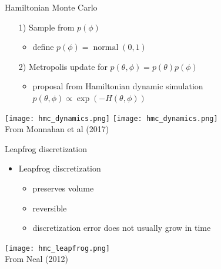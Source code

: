 \documentclass[finnish,english,t]{beamer}
\DeclareMathOperator{\normal}{normal}
\begin{document}
\begin{frame}{Hamiltonian Monte Carlo}

  \begin{itemize}
  \item[1)] Sample from $p(\phi)$
    \begin{itemize}
    \item define $p(\phi) = \normal(0,1)$
    \end{itemize}
  \item[2)] Metropolis update for $p(\theta,\phi)=p(\theta)p(\phi)$
    \begin{itemize}
    \item proposal from Hamiltonian dynamic simulation $p(\theta,\phi) \propto \exp(-H(\theta,\phi))$
    \end{itemize}
  
  \end{itemize}
  \vspace{16.5pt}
  \texttt{[image: hmc\_dynamics.png]}
  \texttt{[image: hmc\_dynamics.png]}\\
  {\footnotesize From Monnahan et al (2017)}
  
\end{frame}

\begin{frame}{Leapfrog discretization}

  \begin{itemize}
  \item Leapfrog discretization
    \begin{itemize}
    \item preserves volume
    \item reversible
    \item discretization error does not usually grow in time
    \end{itemize}
  \end{itemize}
  \vspace{4.3pt}
  {\texttt{[image: hmc\_leapfrog.png]}}
  \\
  {\footnotesize From Neal (2012)}
  
\end{frame}
\end{document}
